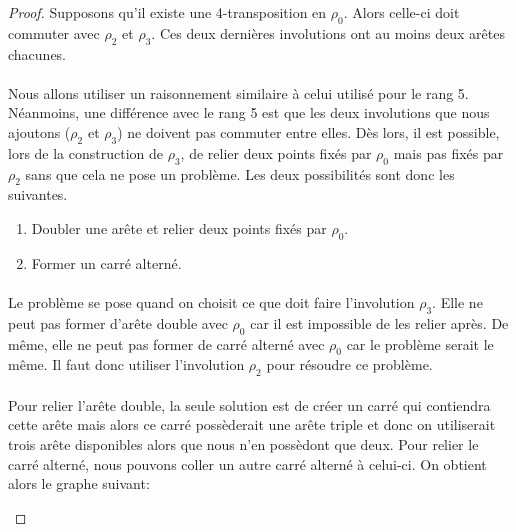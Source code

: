 \begin{proof}
  Supposons qu'il existe une 4-transposition en $\rho_0$. Alors celle-ci doit commuter avec $\rho_2$ et $\rho_3$. Ces deux dernières involutions ont au moins deux arêtes chacunes.



  \paragraph{}
  Nous allons utiliser un raisonnement similaire à celui utilisé pour le rang 5. Néanmoins, une différence avec le rang 5 est que les deux involutions que nous ajoutons ($\rho_2$ et $\rho_3$) ne doivent pas commuter entre elles. Dès lors, il est possible, lors de la construction de $\rho_3$, de relier deux points fixés par $\rho_0$ mais pas fixés par $\rho_2$ sans que cela ne pose un problème. Les deux possibilités sont donc les suivantes.

  \begin{enumerate}
    \item Doubler une arête et relier deux points fixés par $\rho_0$.
    \item Former un carré alterné.
  \end{enumerate}

  \paragraph{}
  Le problème se pose quand on choisit ce que doit faire l'involution $\rho_3$. Elle ne peut pas former d'arête double avec $\rho_0$ car il est impossible de les relier après. De même, elle ne peut pas former de carré alterné avec $\rho_0$ car le problème serait le même. Il faut donc utiliser l'involution $\rho_2$ pour résoudre ce problème.

  \paragraph{}
  Pour relier l'arête double, la seule solution est de créer un carré qui contiendra cette arête mais alors ce carré possèderait une arête triple et donc on utiliserait trois arête disponibles alors que nous n'en possèdont que deux. Pour relier le carré alterné, nous pouvons coller un autre carré alterné à celui-ci. On obtient alors le graphe suivant:

  \begin{figure}[H]
    \begin{center}
      \begin{tikzpicture}


\end{tikzpicture}
\end{center}
\end{figure}
\end{proof}
